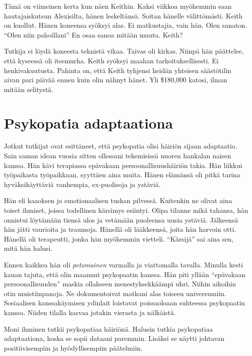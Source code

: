 \begin{tarina}
Tämä on viimeinen kerta kun näen Keithin. Kaksi viikkoa myöhemmin saan hautajaiskutsun Alexisilta, hänen leskeltänsä. Soitan hänelle välittömästi. Keith on kuollut. Hänen koneensa syöksyi alas. Ei matkustajia, vain hän. Olen sanaton. ``Olen niin pahoillani'' En osaa sanoa mitään muuta. Keith?

Tutkija ei löydä koneesta teknistä vikaa. Taivas oli kirkas. Niinpä hän päättelee, että kyseessä oli itsemurha. Keith syöksyi maahan tarkoituksellisesti. Ei henkivakuutusta. Pahinta on, että Keith tyhjensi heidän yhteisen säästötilin aivan pari päivää ennen kuin olin nähnyt hänet. Yli \$180,000 katosi, ilman mitään selitystä.

\end{tarina}

\section{Psykopatia adaptaationa}

Jotkut tutkijat ovat esittäneet, että psykopatia olisi häiriön sijaan adaptaatio. Sain saman idean vuosia sitten ollessani tekemisissä nuoren hankalan naisen kanssa. Hän kävi terapiassa epävakaan persoonallisuushäiriön takia. Hän liikkui työpaikasta työpaikkaan, syyttäen aina muita. Hänen elämänsä oli pitkä tarina hyväksikäyttäviä vanhempia, ex-puolisoja ja ystäviä.

Hän eli kaaoksen ja emotionaalisen tuskan pilvessä. Kuitenkin ne olivat aina toiset ihmiset, joissa todellinen kärsimys esiintyi. Olipa tilanne mikä tahansa, hän onnistui löytämään tiensä ulos ja vetämään puoleensa uusia ystäviä. Jälkeensä hän jätti vaurioita ja traumoja. Hänellä oli lääkkeensä, joita hän harvoin otti. Hänellä oli terapeutti, jonka hän myöhemmin vietteli. ``Kärsijä'' sai aina sen, mitä hän halusi.

Ennen kaikkea hän oli \emph{petomainen} varmalla ja viattomalla tavalla. Minulla kesti kauan tajuta, että olin maannut psykopaatin kanssa. Hän piti yllään ``epävakaan persoonallisuuden'' maskia ollakseen menestyksekkäämpi uhri. Niihin aikoihin otin muistiinpanoja. Ne dokumentoivat matkani alas toiseen universumiin. Sosiaalisen kanssakäymisen ydinlait loistavat poissaoloaan suhteessa psykopaatin kanssa. Niiden tilalla kasvaa jotakin vierasta ja nälkäistä.

Moni ihminen tutkii psykopatiaa häiriönä. Halusin tutkia psykopatiaa adaptaationa, koska se sopii dataani paremmin. Lisäksi se näytti johtavan positiivisempiin ja hyödyllisempiin päätelmiin.

